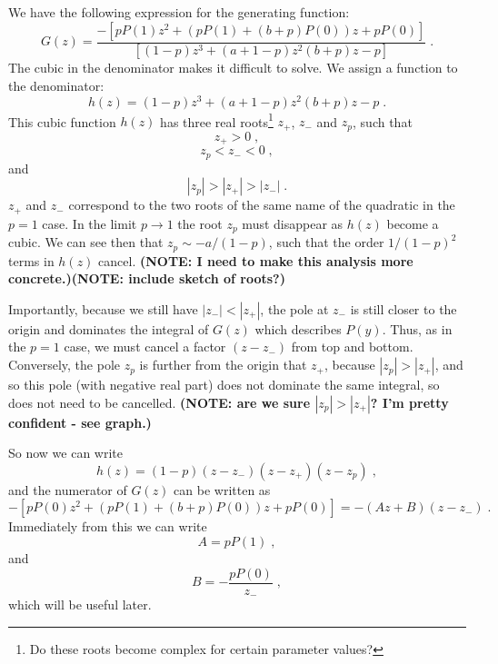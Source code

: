 \documentclass[a4paper,10pt]{article}
\begin{document}
We have the following expression for the generating function:
\begin{equation}
  G(z) = \frac{
	       - \left[ p P(1) z^2 + (pP(1) + (b+p)P(0))z + pP(0) \right] 
              }
              {
               \left[ (1-p)z^3 +(a + 1 -p) z^2 (b+p)z -p \right]
              } \;.
\end{equation}
The cubic in the denominator makes it difficult to solve. We assign a function to the denominator:
\begin{equation}
  h(z) = (1-p)z^3 +(a + 1 -p) z^2 (b+p)z -p \;.
\end{equation}
This cubic function $h(z)$ has three real roots\footnote{Do these roots become complex for certain parameter values?} $z_+$, $z_-$ and $z_p$, such that 
\begin{equation}
  z_+ > 0 \;,
\end{equation}
\begin{equation}
  z_p < z_- < 0 \;,
\end{equation}
and
\begin{equation}
  |z_p| > |z_+| > |z_-| \;. 
\end{equation}
$z_+$ and $z_-$ correspond to the two roots of the same name of the quadratic in the $p=1$ case. In the limit $p\to1$ the root $z_p$ must disappear as $h(z)$ become a cubic. We can see then that $z_p \sim -a/(1-p)$, such that the order $1/(1-p)^2$ terms in $h(z)$ cancel. {\bf (NOTE: I need to make this analysis more concrete.)}{\bf (NOTE: include sketch of roots?)}

Importantly, because we still have $|z_-| < |z_+|$, the pole at $z_-$ is still closer to the origin and dominates the integral of $G(z)$ which describes $P(y)$. Thus, as in the $p=1$ case, we must cancel a factor $(z-z_-)$ from top and bottom. Conversely, the pole $z_p$ is further from the origin that $z_+$, because $|z_p| > |z_+|$, and so this pole (with negative real part) does not dominate the same integral, so does not need to be cancelled. {\bf (NOTE: are we sure $|z_p| > |z_+|$? I'm pretty confident - see graph.)}

So now we can write
\begin{equation}
  h(z) = (1-p)(z-z_-)(z-z_+)(z-z_p)\;, 
\end{equation}
and the numerator of $G(z)$ can be written as
\begin{equation}
  - \left[ pP(0) z^2 + \left( pP(1) + (b+p)P(0) \right) z + pP(0) \right] = -(Az+B)(z-z_-) \;.
\end{equation}
Immediately from this we can write
\begin{equation}
  A = pP(1) \;, 
\end{equation}
and
\begin{equation}\label{eq:B1_app}
  B = -\frac{pP(0)}{z_-} \;,
\end{equation}
which will be useful later.
\end{document}
